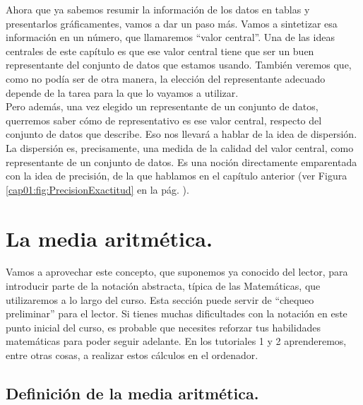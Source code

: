 

Ahora que ya sabemos resumir la información de los datos en tablas y
presentarlos gráficamentes, vamos a dar un paso más. Vamos a sintetizar esa
información en
un número, que llamaremos ``valor central''. Una de las ideas centrales de este capítulo es que ese valor central tiene que ser un buen representante del conjunto de datos que estamos usando. También veremos que, como no podía ser de otra manera, la elección del representante adecuado depende de la tarea para la que lo vayamos a utilizar. \\
Pero además, una vez elegido un representante de un conjunto de datos,
querremos saber cómo de representativo es ese valor central, respecto del
conjunto de datos que describe. Eso nos llevará a hablar de la idea de
dispersión. La dispersión es, precisamente, una medida de la calidad del valor
central, como representante de un conjunto de datos. Es una noción directamente
emparentada con la idea de precisión, de la que hablamos en el capítulo
anterior (ver Figura \ref{cap01:fig:PrecisionExactitud} en la pág.
\pageref{cap01:fig:PrecisionExactitud}).

\section{La media aritmética.}
\label{cap02:sec:MediaAritmetica}

Vamos a aprovechar este concepto, que suponemos ya conocido del lector, para
introducir parte de la notación abstracta, típica de las Matemáticas, que
utilizaremos a lo largo del curso. Esta sección puede servir de ``chequeo
preliminar'' para el lector. Si tienes muchas dificultades con la notación en
este punto inicial del curso, es probable que necesites reforzar tus
habilidades matemáticas para poder seguir adelante. En los tutoriales 1 y 2 aprenderemos, entre otras cosas, a realizar estos cálculos en el ordenador.

\subsection{Definición de la media aritmética.}
\label{cap02:subsec:DefincionMediaAritmetica}

